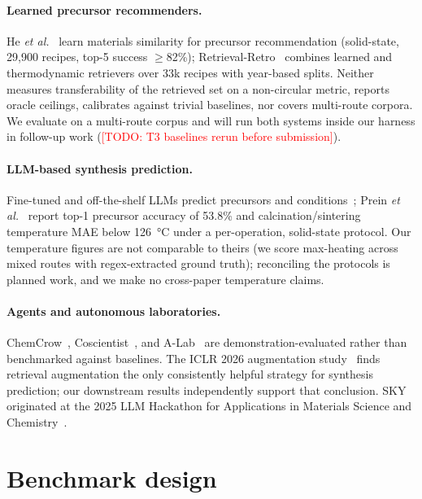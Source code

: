 \documentclass[10pt]{article}
\newcommand{\todo}[1]{\textcolor{red}{[TODO: #1]}}
\begin{document}
\paragraph{Learned precursor recommenders.} He \emph{et
al.}~\cite{he2023precursor} learn materials similarity for precursor
recommendation (solid-state, 29{,}900 recipes, top-5 success $\ge$82\%);
Retrieval-Retro~\cite{noh2024retrievalretro} combines learned and
thermodynamic retrievers over 33k recipes with year-based splits. Neither
measures transferability of the retrieved set on a non-circular metric,
reports oracle ceilings, calibrates against trivial baselines, nor covers
multi-route corpora. We evaluate on a multi-route corpus and will run both
systems inside our harness in follow-up work (\todo{T3 baselines rerun
before submission}).

\paragraph{LLM-based synthesis prediction.} Fine-tuned and off-the-shelf
LLMs predict precursors and conditions~\cite{prein2025ranking,msp_llm2026};
Prein \emph{et al.}~\cite{prein2025ranking} report top-1 precursor accuracy
of 53.8\% and calcination/sintering temperature MAE below
\SI{126}{\celsius} under a per-operation, solid-state protocol. Our
temperature figures are not comparable to theirs (we score max-heating
across mixed routes with regex-extracted ground truth); reconciling the
protocols is planned work, and we make no cross-paper temperature claims.

\paragraph{Agents and autonomous laboratories.}
ChemCrow~\cite{bran2024chemcrow}, Coscientist~\cite{boiko2023coscientist},
and A-Lab~\cite{szymanski2023alab} are demonstration-evaluated rather than
benchmarked against baselines. The ICLR 2026 augmentation
study~\cite{iclr2026benchmark} finds retrieval augmentation the only
consistently helpful strategy for synthesis prediction; our downstream
results independently support that conclusion. SKY originated at the 2025
LLM Hackathon for Applications in Materials Science and
Chemistry~\cite{hackathon2025outcomes}.

\section{Benchmark design}
\label{sec:benchmarks}
\end{document}
